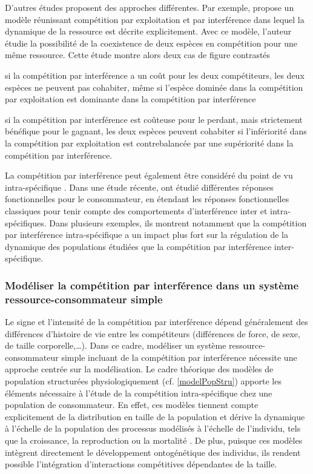D'autres études proposent des approches différentes. Par exemple,
\textcite{amarasekare2002a} propose un modèle réunissant compétition par
exploitation et par interférence dans lequel la dynamique de la ressource est
décrite explicitement. Avec ce modèle, l'auteur étudie la possibilité de la
coexistence de deux espèces en compétition pour une même ressource. Cette étude
montre alors deux cas de figure contrastés \begin{enumerate*}[label=(\roman*),
before=\unskip{ : }, itemjoin={{ ; }}, itemjoin*={{ ; et }}] \item si la
compétition par interférence a un coût pour les deux compétiteurs, les deux
espèces ne peuvent pas cohabiter, même si l'espèce dominée dans la compétition
par exploitation est dominante dans la compétition par interférence \item si la
compétition par interférence est coûteuse pour le perdant, mais strictement
bénéfique pour le gagnant, les deux espèces peuvent cohabiter si l'infériorité
dans la compétition par exploitation est contrebalancée par une supériorité dans
la compétition par interférence. \end{enumerate*}

La compétition par interférence peut également être considéré du point de vu
intra-spécifique \autocite{walde1984a, crowley1987a, maddonni2004a,
smallegange2006a}. Dans une étude récente,\textcite{de-villemereuil2011a} ont
étudié différentes réponses fonctionnelles pour le consommateur, en étendant les
réponses fonctionnelles classiques pour tenir compte des comportements
d'interférence inter et intra-spécifiques. Dans plusieurs exemples, ils montrent
notamment que la compétition par interférence intra-spécifique a un impact plus
fort sur la régulation de la dynamique des populations étudiées que la compétition par
interférence inter-spécifique. 

\subsubsection{Modéliser la compétition par interférence dans un système
ressource-consommateur simple}

Le signe et l'intensité de la compétition par interférence dépend généralement
des différences d'histoire de vie entre les compétiteurs (différences de force,
de sexe, de taille corporelle,\ldots). Dans ce cadre, modéliser un système
ressource-consommateur simple incluant de la compétition par interférence
nécessite une approche centrée sur la modélisation. Le cadre théorique des
modèles de population structurées physiologiquement (cf. \ref{modelPopStru})
apporte les éléments nécessaire à l'étude de la compétition intra-spécifique chez une population de
consommateur. En effet, ces modèles tiennent compte explicitement de la
distribution en taille de la population et dérive la dynamique à l'échelle de la
population des processus modélisés à l'échelle de l'individu, tels que la
croissance, la reproduction ou la mortalité \autocite{kooijman1984a, metz1986a,
de-roos1997a}. De plus, puisque ces modèles intègrent directement le
développement ontogénétique des individus, ils rendent possible l'intégration
d'interactions compétitives dépendantes de la taille. 

